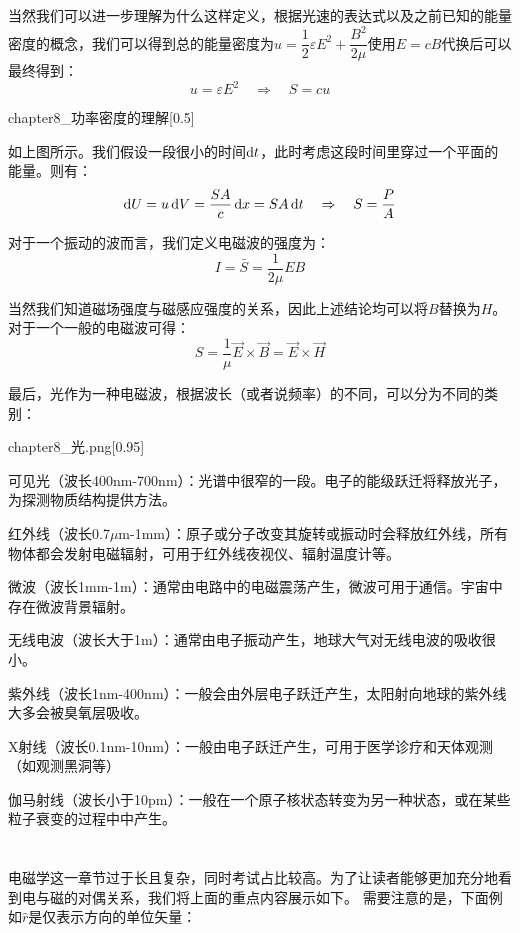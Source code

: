 当然我们可以进一步理解为什么这样定义，根据光速的表达式以及之前已知的能量密度的概念，我们可以得到总的能量密度为$u = \dfrac{1}{2}\varepsilon E^2+\dfrac{B^2}{2\mu}$使用$E=cB$代换后可以最终得到：
\[u = \varepsilon E^2\quad\Rightarrow\quad S=cu\]
\begin{singlefigure}[功率密度的进一步理解]{chapter8_功率密度的理解}[0.5]
\end{singlefigure}

如上图所示。我们假设一段很小的时间$\dif{t}$，此时考虑这段时间里穿过一个平面的能量。则有：
\[\dif{U} = u\dif{V} = \dfrac{SA}{c}\dif{x} = SA\dif{t}\quad\Rightarrow\quad S = \dfrac{P}{A}\]

对于一个振动的波而言，我们定义电磁波的强度为：
\[I = \bar{S}=\dfrac{1}{2\mu}EB\]

当然我们知道磁场强度与磁感应强度的关系，因此上述结论均可以将$B$替换为$H$。对于一个一般的电磁波可得：
\[S= \dfrac{1}{\mu}\vec{E}\times \vec{B}=\vec{E}\times \vec{H}\]

最后，光作为一种电磁波，根据波长（或者说频率）的不同，可以分为不同的类别：
\begin{singlefigure}[光]{chapter8_光.png}[0.95]
\end{singlefigure}

\begin{Itemize}
    \item 可见光（波长400nm-700nm）：光谱中很窄的一段。电子的能级跃迁将释放光子，为探测物质结构提供方法。
    \item 红外线（波长0.7$\mu$m-1mm）：原子或分子改变其旋转或振动时会释放红外线，所有物体都会发射电磁辐射，可用于红外线夜视仪、辐射温度计等。
    \item 微波（波长1mm-1m）：通常由电路中的电磁震荡产生，微波可用于通信。宇宙中存在微波背景辐射。
    \item 无线电波（波长大于1m）：通常由电子振动产生，地球大气对无线电波的吸收很小。
    \item 紫外线（波长1nm-400nm）：一般会由外层电子跃迁产生，太阳射向地球的紫外线大多会被臭氧层吸收。
    \item X射线（波长0.1nm-10nm）：一般由电子跃迁产生，可用于医学诊疗和天体观测（如观测黑洞等）
    \item 伽马射线（波长小于10pm）：一般在一个原子核状态转变为另一种状态，或在某些粒子衰变的过程中中产生。
\end{Itemize}
\section[总结]{}
电磁学这一章节过于长且复杂，同时考试占比较高。为了让读者能够更加充分地看到电与磁的对偶关系，我们将上面的重点内容展示如下。
需要注意的是，下面例如$\hat{r}$是仅表示方向的单位矢量：

